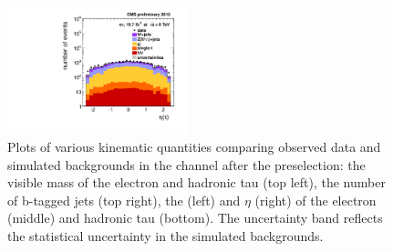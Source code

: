 \begin{figure}[hbtp]
\begin{center}
    \includegraphics[width=0.465\textwidth]{figures/etau/tauEtaMultJet.pdf}
    \caption{Plots of various kinematic quantities comparing observed data and simulated backgrounds in the \etau channel after the preselection: the visible mass of the electron and hadronic tau (top left), the number of b-tagged jets (top right), the \pt (left) and $\eta$ (right) of the electron (middle) and hadronic tau (bottom). The uncertainty band reflects the statistical uncertainty in the simulated backgrounds.}
    \label{fig:preseletau}
  \end{center}
\end{figure}

